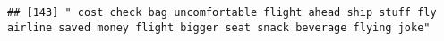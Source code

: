 \documentclass[
]{article}
\begin{document}
\begin{verbatim}
## [143] " cost check bag uncomfortable flight ahead ship stuff fly airline saved money flight bigger seat snack beverage flying joke"                                                                                                                                                                                                                                                                                                                                                                                                                                                                                                                                                                                                                                                                                                                                                                                                                                                                                                                                                                                                                                                                                                                                                                                                                                                                                                                                                                                                                                                                                                                                                                                                                                                                   

\end{verbatim}
\end{document}
